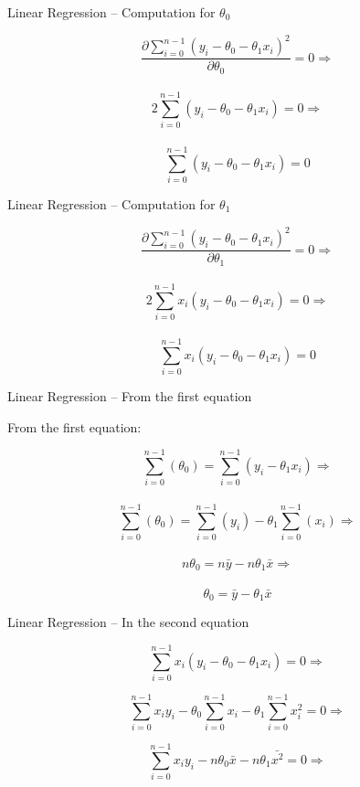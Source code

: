 \documentclass{beamer}
\begin{document}
\begin{frame}
{\centerline{Linear Regression -- Computation for $\theta_0$}}

$$ \frac{\partial \sum_{i=0}^{n-1}(y_i - \theta_0 - \theta_1 x_i)^2}{\partial \theta_0} =  0 \Rightarrow$$ \\
$$ 2 \sum_{i=0}^{n-1}(y_i - \theta_0 - \theta_1 x_i) = 0 \Rightarrow$$ \\
$$ \sum_{i=0}^{n-1}(y_i - \theta_0 - \theta_1 x_i) = 0 $$

\end{frame}

\begin{frame}
{\centerline{Linear Regression -- Computation for $\theta_1$}}

$$ \frac{\partial \sum_{i=0}^{n-1}(y_i - \theta_0 - \theta_1 x_i)^2}{\partial \theta_1} =  0 \Rightarrow$$ \\
$$ 2 \sum_{i=0}^{n-1}x_i(y_i - \theta_0 - \theta_1 x_i) = 0 \Rightarrow$$ \\
$$ \sum_{i=0}^{n-1}x_i(y_i - \theta_0 - \theta_1 x_i) = 0 $$

\end{frame}

\begin{frame}
{\centerline{Linear Regression -- From the first equation}}

From the first equation:

$$ \sum_{i=0}^{n-1}(\theta_0) = \sum_{i=0}^{n-1}( y_i - \theta_1 x_i)  \Rightarrow $$ \\
$$ \sum_{i=0}^{n-1}(\theta_0) = \sum_{i=0}^{n-1}( y_i ) - \theta_1 \sum_{i=0}^{n-1}(x_i)  \Rightarrow $$\\
$$ n \theta_0 = n \bar{y} - n \theta_1 \bar{x}  \Rightarrow $$\\
$$ \theta_0 = \bar{y} - \theta_1 \bar{x}  $$



\end{frame}

\begin{frame}
{\centerline{Linear Regression -- In the second equation}}
$$ \sum_{i=0}^{n-1}x_i(y_i - \theta_0 - \theta_1 x_i) = 0   \Rightarrow $$

$$ \sum_{i=0}^{n-1}x_iy_i - \theta_0 \sum_{i=0}^{n-1}x_i - \theta_1 \sum_{i=0}^{n-1}x_i^2 = 0 \Rightarrow $$

$$ \sum_{i=0}^{n-1}x_iy_i - n \theta_0 \bar{x}  - n \theta_1 \bar{x^2} = 0 \Rightarrow $$


\end{frame}
\end{document}
